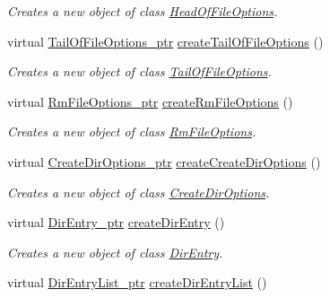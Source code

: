 \begin{DoxyCompactItemize}
\begin{DoxyCompactList}\small\item\em Creates a new object of class \hyperlink{classFMS__Data_1_1HeadOfFileOptions}{HeadOfFileOptions}. \item\end{DoxyCompactList}\item 
virtual \hyperlink{classFMS__Data_1_1TailOfFileOptions}{TailOfFileOptions\_\-ptr} \hyperlink{classFMS__Data_1_1FMS__DataFactory_ad77f1e634ef47813973fc07b8dcfda5c}{createTailOfFileOptions} ()
\begin{DoxyCompactList}\small\item\em Creates a new object of class \hyperlink{classFMS__Data_1_1TailOfFileOptions}{TailOfFileOptions}. \item\end{DoxyCompactList}\item 
virtual \hyperlink{classFMS__Data_1_1RmFileOptions}{RmFileOptions\_\-ptr} \hyperlink{classFMS__Data_1_1FMS__DataFactory_a32ff9ba982c72ee6a7c7fe8ede2942f5}{createRmFileOptions} ()
\begin{DoxyCompactList}\small\item\em Creates a new object of class \hyperlink{classFMS__Data_1_1RmFileOptions}{RmFileOptions}. \item\end{DoxyCompactList}\item 
virtual \hyperlink{classFMS__Data_1_1CreateDirOptions}{CreateDirOptions\_\-ptr} \hyperlink{classFMS__Data_1_1FMS__DataFactory_ad1ef13617babf7b1abd584ac711d4b07}{createCreateDirOptions} ()
\begin{DoxyCompactList}\small\item\em Creates a new object of class \hyperlink{classFMS__Data_1_1CreateDirOptions}{CreateDirOptions}. \item\end{DoxyCompactList}\item 
virtual \hyperlink{classFMS__Data_1_1DirEntry}{DirEntry\_\-ptr} \hyperlink{classFMS__Data_1_1FMS__DataFactory_a0dcf96519fb7c3249876c53d37c63e1c}{createDirEntry} ()
\begin{DoxyCompactList}\small\item\em Creates a new object of class \hyperlink{classFMS__Data_1_1DirEntry}{DirEntry}. \item\end{DoxyCompactList}\item 
virtual \hyperlink{classFMS__Data_1_1DirEntryList}{DirEntryList\_\-ptr} \hyperlink{classFMS__Data_1_1FMS__DataFactory_a0476c979bcc225baf04609b0606f98ad}{createDirEntryList} ()

\end{DoxyCompactItemize}
